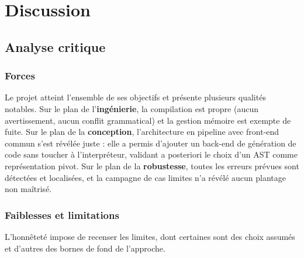 \chapter{Discussion}
\label{chap:discussion}

\section{Analyse critique}

\subsection{Forces}

Le projet atteint l'ensemble de ses objectifs et présente plusieurs qualités
notables. Sur le plan de l'\textbf{ingénierie}, la compilation est propre (aucun
avertissement, aucun conflit grammatical) et la gestion mémoire est exempte de
fuite. Sur le plan de la \textbf{conception}, l'architecture en pipeline avec
front-end commun s'est révélée juste : elle a permis d'ajouter un back-end de
génération de code sans toucher à l'interpréteur, validant a posteriori le choix
d'un AST comme représentation pivot. Sur le plan de la \textbf{robustesse}, toutes
les erreurs prévues sont détectées et localisées, et la campagne de cas limites
n'a révélé aucun plantage non maîtrisé.

\subsection{Faiblesses et limitations}

L'honnêteté impose de recenser les limites, dont certaines sont des choix assumés
et d'autres des bornes de fond de l'approche.

